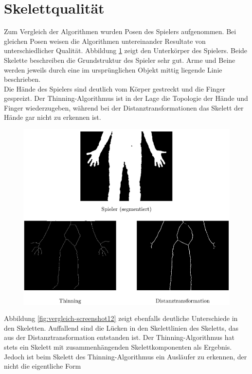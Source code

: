 \section{Skelettqualität}
Zum Vergleich der Algorithmen wurden Posen des Spielers aufgenommen. Bei gleichen Posen
weisen die Algorithmen untereinander Resultate von unterschiedlicher Qualität. Abbildung \ref{fig:vergleich-screenshot0} zeigt
den Unterkörper des Spielers. Beide Skelette beschreiben die Grundstruktur des Spieler sehr gut. Arme und Beine werden jeweils durch eine im ursprünglichen Objekt mittig liegende Linie beschrieben. \\ Die Hände des Spielers sind deutlich vom Körper gestreckt und die Finger gespreizt. Der Thinning-Algorithmus ist in der Lage die Topologie der Hände und Finger wiederzugeben, während bei der
Distanztransformationen das Skelett der Hände gar nicht zu erkennen ist. \\ 
\begin{figure}[htbp]
\centering
\includegraphics[width=1.0\linewidth]{./fig/vergleich-screenshot0}
\caption{}
\label{fig:vergleich-screenshot0}
\end{figure}
Abbildung \ref{fig:vergleich-screenshot12} zeigt ebenfalls deutliche Unterschiede in den Skeletten. Auffallend sind die Lücken in den Skelettlinien des Skeletts, das aus der Distanztransformation entstanden 
ist. Der Thinning-Algorithmus hat stets ein Skelett mit zusammenhängenden Skelettkomponenten als Ergebnis. 
Jedoch ist beim Skelett des Thinning-Algorithmus ein Ausläufer zu erkennen, der nicht die eigentliche Form
